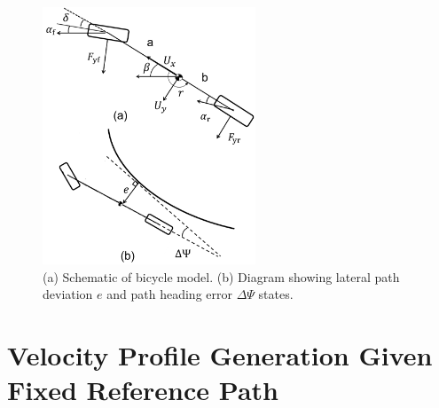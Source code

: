 \documentclass[twocolumn,10pt]{asme2ej}
\begin{document}
  
\begin{figure}
\centering
\includegraphics[width=2.5in]{figures/BikeModelSchematic.png}
\caption{(a) Schematic of bicycle model. (b) Diagram showing lateral path deviation $e$ and path heading error $\Delta\Psi$ states.}
\label{fig:bikemodel}
\end{figure} 

\section{Velocity Profile Generation Given Fixed Reference Path}
\label{sec:VP}
\end{document}
